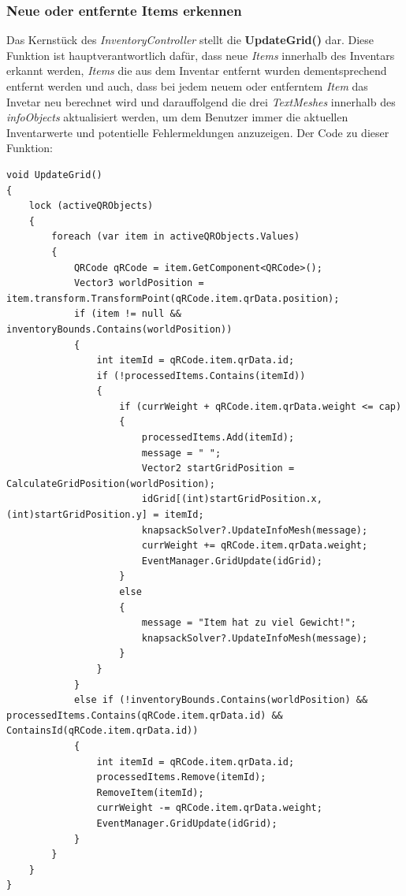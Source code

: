 \subsubsection{Neue oder entfernte Items erkennen}
Das Kernstück des \textit{InventoryController} stellt die \textbf{UpdateGrid()} dar. Diese Funktion ist hauptverantwortlich
dafür, dass neue \textit{Items} innerhalb des Inventars erkannt werden, \textit{Items} die aus dem Inventar entfernt
wurden dementsprechend entfernt werden und auch, dass bei jedem neuem oder entferntem \textit{Item} das Invetar neu
berechnet wird und darauffolgend die drei \textit{TextMeshes} innerhalb des \textit{infoObjects} aktualisiert werden, um
dem Benutzer immer  die aktuellen Inventarwerte und potentielle Fehlermeldungen anzuzeigen. Der Code zu dieser Funktion:
\begin{lstlisting}[style=csharp, caption={Neue / Entfernte Items erkennen}, label=code:controller_updateGrid]
void UpdateGrid()
{
    lock (activeQRObjects)
    {
        foreach (var item in activeQRObjects.Values)
        {
            QRCode qRCode = item.GetComponent<QRCode>();
            Vector3 worldPosition = item.transform.TransformPoint(qRCode.item.qrData.position);
            if (item != null && inventoryBounds.Contains(worldPosition))
            {
                int itemId = qRCode.item.qrData.id;
                if (!processedItems.Contains(itemId))
                {
                    if (currWeight + qRCode.item.qrData.weight <= cap)
                    {
                        processedItems.Add(itemId);
                        message = " ";
                        Vector2 startGridPosition = CalculateGridPosition(worldPosition);
                        idGrid[(int)startGridPosition.x, (int)startGridPosition.y] = itemId;
                        knapsackSolver?.UpdateInfoMesh(message);
                        currWeight += qRCode.item.qrData.weight;
                        EventManager.GridUpdate(idGrid);
                    }
                    else
                    {
                        message = "Item hat zu viel Gewicht!";
                        knapsackSolver?.UpdateInfoMesh(message);
                    }
                }
            }
            else if (!inventoryBounds.Contains(worldPosition) && processedItems.Contains(qRCode.item.qrData.id) && ContainsId(qRCode.item.qrData.id))
            {
                int itemId = qRCode.item.qrData.id;
                processedItems.Remove(itemId);
                RemoveItem(itemId);
                currWeight -= qRCode.item.qrData.weight;
                EventManager.GridUpdate(idGrid);
            }
        }
    }
}
\end{lstlisting}\\
